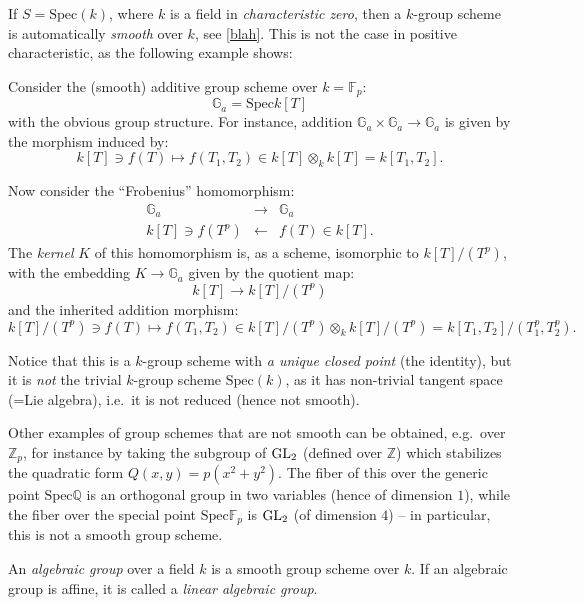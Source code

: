  
If $S=\text{Spec}(k)$, where $k$ is a field in \emph{characteristic zero}, then a $k$-group scheme is automatically \emph{smooth} over $k$, see \ref{blah}. This is not the case in positive characteristic, as the following example shows:

\begin{example}
 \label{example-Frobeniuskernel}
Consider the (smooth) additive group scheme over $k=\mathbb F_p$:
$$\mathbb G_a = \text{Spec} k[T]$$
with the obvious group structure. For instance, addition $\mathbb G_a\times\mathbb G_a\to \mathbb G_a$ is given by the morphism induced by: 
$$k[T] \ni f(T)\mapsto f(T_1,T_2) \in k[T]\otimes_k k[T]=k[T_1,T_2].$$


Now consider the ``Frobenius'' homomorphism:
\begin{eqnarray*}
\mathbb G_a &\to&\mathbb G_a \\
k[T] \ni f(T^p) &\leftarrow & f(T) \in k[T]. 
\end{eqnarray*}
The \emph{kernel} $K$ of this homomorphism is, as a scheme, isomorphic to $k[T]/(T^p)$, with the embedding $K\to \mathbb G_a$ given by the quotient map:
$$k[T] \to k[T]/(T^p)$$
and the inherited addition morphism:
$$k[T]/(T^p) \ni f(T)\mapsto f(T_1,T_2) \in k[T]/(T^p)\otimes_k k[T]/(T^p)=k[T_1,T_2]/(T_1^p,T_2^p).$$

Notice that this is a $k$-group scheme with \emph{a unique closed point} (the identity), but it is \emph{not} the trivial $k$-group scheme $\text{Spec}(k)$, as it has non-trivial tangent space (=Lie algebra), i.e.\ it is not reduced (hence not smooth).
\end{example}





Other examples of group schemes that are not smooth can be obtained, e.g.\, over $\mathbb Z_p$, for instance by taking the subgroup of ${\rm GL}_2$ (defined over $\mathbb Z$) which stabilizes the quadratic form $Q(x,y)=p(x^2+y^2)$. The fiber of this over the generic point $\text{Spec} \mathbb Q$ is an orthogonal group in two variables (hence of dimension $1$), while the fiber over the special point $\text{Spec} \mathbb F_p$ is ${\rm GL}_2$ (of dimension $4$) -- in particular, this is not a smooth group scheme. 

\begin{definition}
 \label{definition-algebraic-group}
An {\it algebraic group} over a field $k$ is a smooth group scheme over $k$. If an algebraic group is affine, it is called a {\it linear algebraic group}.
\end{definition}



